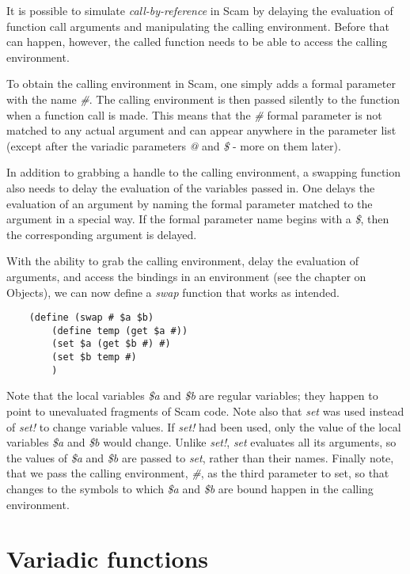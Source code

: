 It is possible to simulate {\it call-by-reference} in Scam by 
delaying the evaluation of function call arguments and
manipulating the calling environment.
Before that can happen, however, the called function needs to
be able to access the calling environment.

To obtain the
calling environment in Scam,
one simply adds a formal parameter with the name {\it \#}.
The calling environment is then passed silently to the
function when a function call is made. This means that
the {\it \#} formal parameter is not matched to any actual argument
and can appear anywhere in the parameter list (except after
the variadic parameters {\it @} and {\it \$} - more on them later).

In addition to grabbing a handle to the calling environment,
a swapping function also needs to delay the evaluation of
the variables passed in.
One delays the evaluation of an argument by naming the formal
parameter matched to the argument in a special way. If the
formal parameter name begins with a {\it \$}, then
the corresponding argument is delayed.

With the ability to grab the calling environment,
delay the evaluation of arguments, and access the
bindings in an environment (see the chapter on Objects),
we can now define a {\it swap} function that works as intended.

\begin{verbatim}
    (define (swap # $a $b)
        (define temp (get $a #))
        (set $a (get $b #) #)
        (set $b temp #)
        )
\end{verbatim}

Note that the local variables {\it \$a} and {\it \$b} are regular variables;
they happen to point to unevaluated fragments
of Scam code.
Note also that {\it set} was used instead of {\it set!}
to change variable values.
If {\it set!} had been used, only the value of the local
variables {\it \$a} and {\it \$b} would change.
Unlike {\it set!}, {\it set} evaluates all its arguments,
so the values of {\it \$a} and {\it \$b} are passed to {\it set}, rather than
their names.
Finally note, that we pass the calling environment, {\it \#}, as the third
parameter to set, so that changes to the symbols to which
{\it \$a} and {\it \$b}
are bound
happen in the calling environment.

\section{Variadic functions}

